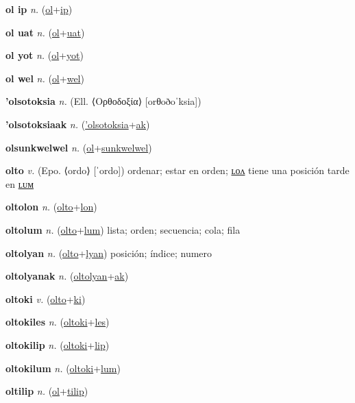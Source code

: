 \textbf{\hypertarget{ol ip}{ol ip}} \textit{n.} (\hyperlink{ol}{ol}+\allowbreak \hyperlink{ip}{ip})


\textbf{\hypertarget{ol uat}{ol uat}} \textit{n.} (\hyperlink{ol}{ol}+\allowbreak \hyperlink{uat}{uat})


\textbf{\hypertarget{ol yot}{ol yot}} \textit{n.} (\hyperlink{ol}{ol}+\allowbreak \hyperlink{yot}{yot})


\textbf{\hypertarget{ol wel}{ol wel}} \textit{n.} (\hyperlink{ol}{ol}+\allowbreak \hyperlink{wel}{wel})


\textbf{\hypertarget{'olsotoksia}{'olsotoksia}} \textit{n.} (Ell. ⟨Ορθοδοξία⟩ [orθoðoˈksia])


\textbf{\hypertarget{'olsotoksiaak}{'olsotoksiaak}} \textit{n.} (\hyperlink{'olsotoksia}{'olsotoksia}+\allowbreak \hyperlink{ak}{ak})


\textbf{\hypertarget{olsunkwelwel}{olsunkwelwel}} \textit{n.} (\hyperlink{ol}{ol}+\allowbreak \hyperlink{sunkwelwel}{sunkwelwel})


\textbf{\hypertarget{olto}{olto}} \textit{v.} (Epo. ⟨ordo⟩ [ˈordo])
ordenar; estar en orden; \hyperlink{oltolon}{ʟᴏᴧ} tiene una posición tarde en \hyperlink{oltolum}{ʟᴜᴍ}

\textbf{\hypertarget{oltolon}{oltolon}} \textit{n.} (\hyperlink{olto}{olto}+\allowbreak \hyperlink{lon}{lon})


\textbf{\hypertarget{oltolum}{oltolum}} \textit{n.} (\hyperlink{olto}{olto}+\allowbreak \hyperlink{lum}{lum})
lista; orden; secuencia; cola; fila

\textbf{\hypertarget{oltolyan}{oltolyan}} \textit{n.} (\hyperlink{olto}{olto}+\allowbreak \hyperlink{lyan}{lyan})
posición; índice; numero

\textbf{\hypertarget{oltolyanak}{oltolyanak}} \textit{n.} (\hyperlink{oltolyan}{oltolyan}+\allowbreak \hyperlink{ak}{ak})


\textbf{\hypertarget{oltoki}{oltoki}} \textit{v.} (\hyperlink{olto}{olto}+\allowbreak \hyperlink{ki}{ki})


\textbf{\hypertarget{oltokiles}{oltokiles}} \textit{n.} (\hyperlink{oltoki}{oltoki}+\allowbreak \hyperlink{les}{les})


\textbf{\hypertarget{oltokilip}{oltokilip}} \textit{n.} (\hyperlink{oltoki}{oltoki}+\allowbreak \hyperlink{lip}{lip})


\textbf{\hypertarget{oltokilum}{oltokilum}} \textit{n.} (\hyperlink{oltoki}{oltoki}+\allowbreak \hyperlink{lum}{lum})


\textbf{\hypertarget{oltilip}{oltilip}} \textit{n.} (\hyperlink{ol}{ol}+\allowbreak \hyperlink{tilip}{tilip})


